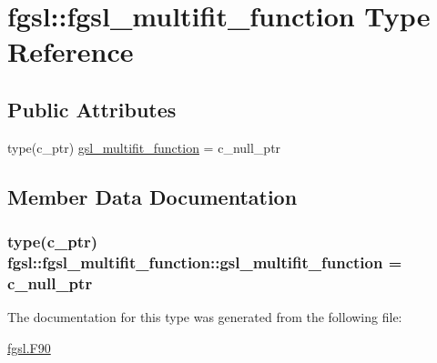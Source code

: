 \hypertarget{structfgsl_1_1fgsl__multifit__function}{\section{fgsl\-:\-:fgsl\-\_\-multifit\-\_\-function Type Reference}
\label{structfgsl_1_1fgsl__multifit__function}
}
\subsection*{Public Attributes}
\begin{DoxyCompactItemize}
\item 
type(c\-\_\-ptr) \hyperlink{structfgsl_1_1fgsl__multifit__function_a81b590be8daf3e68d5a568a1b9cd9d17}{gsl\-\_\-multifit\-\_\-function} = c\-\_\-null\-\_\-ptr
\end{DoxyCompactItemize}


\subsection{Member Data Documentation}
\hypertarget{structfgsl_1_1fgsl__multifit__function_a81b590be8daf3e68d5a568a1b9cd9d17}{
\subsubsection[{gsl\-\_\-multifit\-\_\-function}]{\setlength{\rightskip}{0pt plus 5cm}type(c\-\_\-ptr) fgsl\-::fgsl\-\_\-multifit\-\_\-function\-::gsl\-\_\-multifit\-\_\-function = c\-\_\-null\-\_\-ptr}}\label{structfgsl_1_1fgsl__multifit__function_a81b590be8daf3e68d5a568a1b9cd9d17}


The documentation for this type was generated from the following file\-:\begin{DoxyCompactItemize}
\item 
\hyperlink{fgsl_8F90}{fgsl.\-F90}\end{DoxyCompactItemize}
